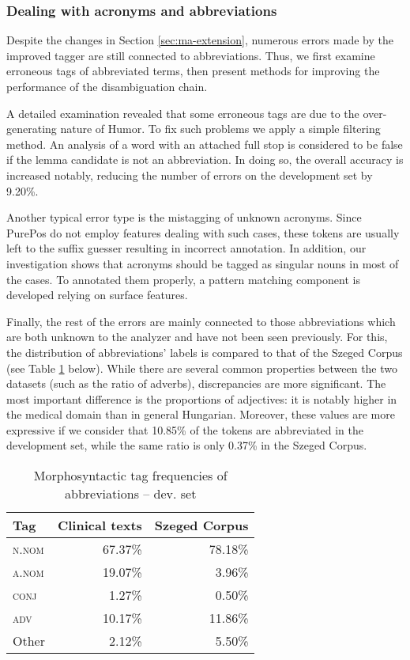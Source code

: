 \subsubsection{Dealing with acronyms and abbreviations}

Despite the changes in Section \ref{sec:ma-extension}, numerous errors made by the improved tagger are still connected to abbreviations. 
Thus, we first examine erroneous tags of abbreviated terms, then present methods for improving the performance of the disambiguation chain. 

A detailed examination revealed that some erroneous tags are due to the over-generating nature of Humor. 
To fix such problems we apply a simple filtering method. 
An analysis of a word with an attached full stop is considered to be false if the lemma candidate is not an abbreviation. 
In doing so, the overall accuracy is increased notably, reducing the number of errors on the development set by 9.20\%.

Another typical error type is the mistagging of unknown acronyms. 
Since PurePos do not employ features  dealing with such cases, these tokens are usually left to the suffix guesser resulting in incorrect annotation. 
In addition, our investigation shows that acronyms should be tagged as singular nouns in most of the cases. 
To annotated them properly, a pattern matching component is developed relying on surface features.

Finally, the rest of the errors are mainly connected to those abbreviations which are both unknown to the analyzer and have not been seen previously. 
For this, the distribution of abbreviations' labels is compared to that of the Szeged Corpus (see Table \ref{tab:pos_distribution} below).
While there are several common properties between the two datasets (such as the ratio of adverbs), discrepancies are more significant. 
The most important difference is the proportions of adjectives: it is notably higher in the medical domain than in general Hungarian. 
Moreover, these values are more expressive if we consider that 10.85\% of the tokens are abbreviated in the development set, while the same ratio is only 0.37\% in the Szeged Corpus. 

\begin{table}[h]
\centering
\caption{Morphosyntactic tag frequencies of abbreviations -- dev. set}
\label{tab:pos_distribution}
\begin{tabular}{ l r r} 
\hline
Tag & Clinical texts & Szeged Corpus  \\ 
\hline
\scshape{n.nom} & 67.37\% & 78.18\% \\
\scshape{a.nom} & 19.07\% & 3.96\% \\
\scshape{conj} & 1.27\% & 0.50\% \\
\scshape{adv} & 10.17\% & 11.86\% \\
Other & 2.12\% & 5.50\% \\
\hline
\end{tabular}
\end{table}

